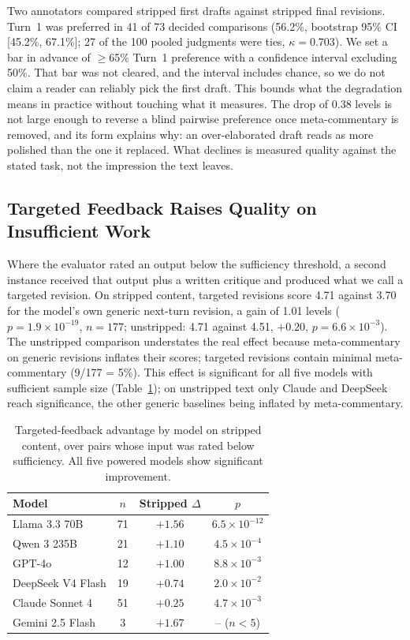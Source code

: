 Two annotators compared stripped first drafts against stripped final revisions. Turn~1
was preferred in 41 of 73 decided
comparisons (56.2\%, bootstrap 95\% CI [45.2\%, 67.1\%]; 27 of the 100 pooled judgments
were ties, $\kappa = 0.703$). We set a bar in advance of $\geq$65\% Turn~1 preference with
a confidence interval excluding 50\%. That bar was not cleared, and the interval includes
chance, so we do not claim a reader can reliably pick the first draft.
This bounds what the degradation means in practice without touching what it measures. The
drop of 0.38 levels is not large enough to reverse a blind pairwise preference once
meta-commentary is removed, and its form explains why: an over-elaborated draft reads as more
polished than the one it replaced. What declines is measured quality against the stated task,
not the impression the text leaves.

\subsection{Targeted Feedback Raises Quality on Insufficient Work}
\label{sec:targeted}

Where the evaluator rated an output below the sufficiency threshold, a second instance received that output plus a written critique and produced what we call a targeted revision. On stripped content, targeted revisions score 4.71 against 3.70 for the model's own generic next-turn revision, a gain of 1.01 levels ($p = 1.9 \times 10^{-19}$, $n = 177$; unstripped: 4.71 against 4.51, $+0.20$, $p = 6.6 \times 10^{-3}$). The unstripped comparison understates the real effect because meta-commentary on generic revisions inflates their scores; targeted revisions contain minimal meta-commentary (9/177 = 5\%).
This effect is significant for all five models with sufficient sample size (Table~\ref{tab:targeted-per-model}); on unstripped text only Claude and DeepSeek reach significance, the other generic baselines being inflated by meta-commentary.

\begin{table}[t]
    \centering
    \small
    \begin{tabular}{lccc}
    \toprule
    Model & $n$ & Stripped $\Delta$ & $p$ \\
    \midrule
    Llama 3.3 70B & 71 & $+1.56$ & $6.5 \times 10^{-12}$ \\
    Qwen 3 235B & 21 & $+1.10$ & $4.5 \times 10^{-4}$ \\
    GPT-4o & 12 & $+1.00$ & $8.8 \times 10^{-3}$ \\
    DeepSeek V4 Flash & 19 & $+0.74$ & $2.0 \times 10^{-2}$ \\
    Claude Sonnet 4 & 51 & $+0.25$ & $4.7 \times 10^{-3}$ \\
    Gemini 2.5 Flash & 3 & $+1.67$ & -- ($n < 5$) \\
    \bottomrule
    \end{tabular}
    \caption{Targeted-feedback advantage by model on stripped content, over pairs whose input was rated below sufficiency. All five powered models show significant improvement.}
    \label{tab:targeted-per-model}
\end{table}

